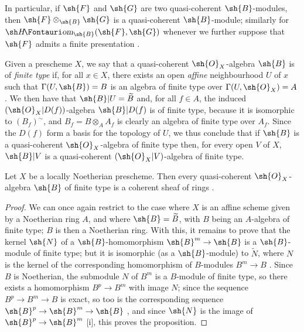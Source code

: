 In particular, if $\sh{F}$ and $\sh{G}$ are two quasi-coherent $\sh{B}$-modules, then $\sh{F}\otimes_{\sh{B}}\sh{G}$ is a quasi-coherent $\sh{B}$-module; similarly for $\shHom_{\sh{B}}(\sh{F},\sh{G})$ whenever we further suppose that $\sh{F}$ admits a finite presentation .

\begin{env}[9.6.2]
\label{I.9.6.2}
Given a prescheme $X$, we say that a quasi-coherent $\sh{O}_X$-algebra $\sh{B}$ is of \emph{finite type} if, for all $x\in X$, there exists an open \emph{affine} neighbourhood $U$ of $x$ such that $\Gamma(U,\sh{B})=B$ is an algebra of finite type over $\Gamma(U,\sh{O}_X)=A$.
We then have that $\sh{B}|U=\widetilde{B}$ and, for all $f\in A$, the induced $(\sh{O}_X|D(f))$-algebra $\sh{B}|D(f)$ is of finite type, because it is isomorphic to $(B_f)^{\sim}$, and $B_f=B\otimes_A A_f$ is clearly an algebra of finite type over $A_f$.
Since the $D(f)$ form a basis for the topology of $U$, we thus conclude that if $\sh{B}$ is a quasi-coherent $\sh{O}_X$-algebra of finite type then, for every open $V$ of $X$, $\sh{B}|V$ is a quasi-coherent $(\sh{O}_X|V)$-algebra of finite type.
\end{env}

\begin{proposition}[9.6.3]
\label{I.9.6.3}
Let $X$ be a locally Noetherian prescheme.
Then every quasi-coherent $\sh{O}_X$-algebra $\sh{B}$ of finite type is a coherent sheaf of rings .
\end{proposition}

\begin{proof}
We can once again restrict to the case where $X$ is an affine scheme given by a Noetherian ring $A$, and where $\sh{B}=\widetilde{B}$, with $B$ being an $A$-algebra of finite type; $B$ is then a Noetherian ring.
With this, it remains to prove that the kernel $\sh{N}$ of a $\sh{B}$-homomorphism $\sh{B}^m\to\sh{B}$ is a $\sh{B}$-module
of finite type; but it is isomorphic (as a $\sh{B}$-module) to $\widetilde{N}$, where $N$ is the kernel of the corresponding homomorphism of $B$-modules $B^m\to B$ .
Since $B$ is Noetherian, the submodule $N$ of $B^m$ is a $B$-module of finite type, so there exists a homomorphism $B^p\to B^m$ with image $N$; since the sequence $B^p\to B^m\to B$ is exact, so too is the corresponding sequence $\sh{B}^p\to\sh{B}^m\to\sh{B}$ , and since $\sh{N}$ is the image of $\sh{B}^p\to\sh{B}^m$ [i], this proves the proposition.
\end{proof}

